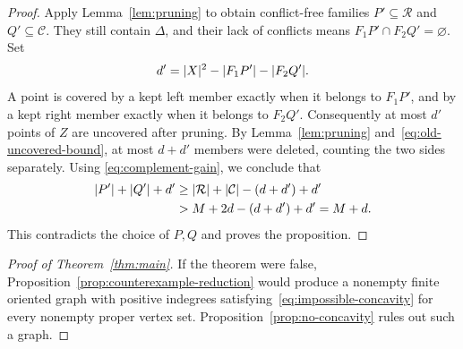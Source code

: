 \begin{proof}
Apply Lemma~\ref{lem:pruning} to obtain conflict-free families
$P'\subseteq\mathcal R$ and $Q'\subseteq\mathcal C$.
They still contain $\Delta$, and their lack of conflicts means
$F_1P'\cap F_2Q'=\varnothing$.  Set
\[
 d'=\lvert X\rvert^2-\lvert F_1P'\rvert-\lvert F_2Q'\rvert.
\]
A point is covered by a kept left member exactly when it belongs to
$F_1P'$, and by a kept right member exactly when it belongs to $F_2Q'$.
Consequently at most $d'$ points of $Z$ are uncovered after pruning.
By Lemma~\ref{lem:pruning} and~\eqref{eq:old-uncovered-bound}, at most $d+d'$ members
were deleted, counting the two sides separately.  Using
\eqref{eq:complement-gain}, we conclude that
\[
 \begin{aligned}
 \lvert P'\rvert+\lvert Q'\rvert+d'
 &\ge \lvert \mathcal R\rvert+\lvert \mathcal C\rvert-(d+d')+d'\\
 &>M+2d-(d+d')+d'=M+d.
 \end{aligned}
\]
This contradicts the choice of $P,Q$ and proves the proposition.
\end{proof}

\begin{proof}[Proof of Theorem~\ref{thm:main}]
If the theorem were false, Proposition~\ref{prop:counterexample-reduction}
would produce a nonempty finite oriented graph with positive indegrees
satisfying~\eqref{eq:impossible-concavity} for every nonempty proper vertex
set.  Proposition~\ref{prop:no-concavity} rules out such a graph.
\end{proof}
